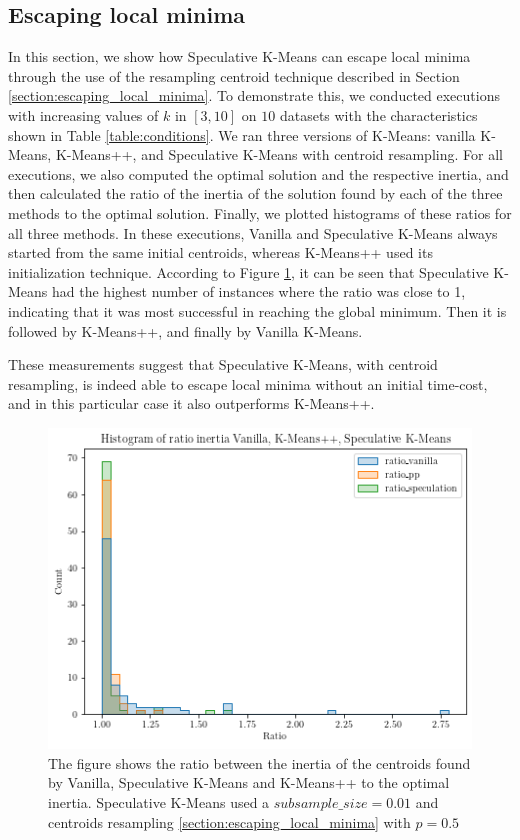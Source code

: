 \subsection{Escaping local minima}
\label{section:evaluation_escaping_local_minima}
In this section, we show how Speculative K-Means can escape local minima through the use of the resampling centroid technique described in Section \ref{section:escaping_local_minima}. To demonstrate this, we conducted executions with increasing values of $k$ in $[3,10]$ on $10$ datasets with the characteristics shown in Table \ref{table:conditions}. We ran three versions of K-Means: vanilla K-Means,  K-Means++, and Speculative K-Means with centroid resampling. For all executions, we also computed the optimal solution and the respective inertia, and then calculated the ratio of the inertia of the solution found by each of the three methods to the optimal solution. Finally, we plotted histograms of these ratios for all three methods. In these executions, Vanilla and Speculative K-Means always started from the same initial centroids, whereas K-Means++ used its initialization technique. According to Figure \ref{fig:histogram_escape_local_minima}, it can be seen that Speculative K-Means had the highest number of instances where the ratio was close to 1, indicating that it was most successful in reaching the global minimum. Then it is followed by K-Means++, and finally by Vanilla K-Means.

These measurements suggest that Speculative K-Means, with centroid resampling, is indeed able to escape local minima without an initial time-cost, and in this particular case it also outperforms K-Means++.

\begin{figure}[h]
\centering
\includegraphics[width=\linewidth]{./plots/histogram_escape_local_minima.png}
\caption{The figure shows the ratio between the inertia of the centroids found by Vanilla, Speculative K-Means and K-Means++ to the optimal inertia. Speculative K-Means used a $subsample\_size=0.01$ and centroids resampling \ref{section:escaping_local_minima} with $p=0.5$}
\label{fig:histogram_escape_local_minima}
\end{figure}

